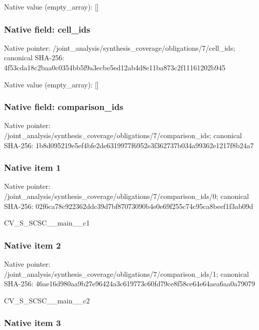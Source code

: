 \documentclass[10pt,a4paper]{article}
\begin{document}
Native value (empty\_array): []



\subsubsection{Native field: cell\_ids}


Native pointer: /joint\_analysis/synthesi\allowbreak{}s\_coverage/obligations/7\allowbreak{}/cell\_ids; canonical SHA-256: 4f53cda18c2baa0c0354bb5f\allowbreak{}9a3ecbe5ed12ab4d8e11ba87\allowbreak{}3c2f11161202b945



Native value (empty\_array): []



\subsubsection{Native field: comparison\_ids}


Native pointer: /joint\_analysis/synthesi\allowbreak{}s\_coverage/obligations/7\allowbreak{}/comparison\_ids; canonical SHA-256: 1b8d095219e5ef4bfe2de631\allowbreak{}9977f6952e3f362737b034a9\allowbreak{}9362e1217f8b24a7



\subsubsection{Native item 1}


Native pointer: /joint\_analysis/synthesi\allowbreak{}s\_coverage/obligations/7\allowbreak{}/comparison\_ids/0; canonical SHA-256: 02f6ca78c922362ddc39d7bf\allowbreak{}87073090b4e0e69f255c74c9\allowbreak{}5ca8beef1f3ab09d


CV\_S\_SCSC\_\_main\_\_c1


\subsubsection{Native item 2}


Native pointer: /joint\_analysis/synthesi\allowbreak{}s\_coverage/obligations/7\allowbreak{}/comparison\_ids/1; canonical SHA-256: 46ae16d980aa9b27e96424a3\allowbreak{}c619773c60fd79ce8f58ce64\allowbreak{}e64aea6aa0a79079


CV\_S\_SCSC\_\_main\_\_c2


\subsubsection{Native item 3}
\end{document}
